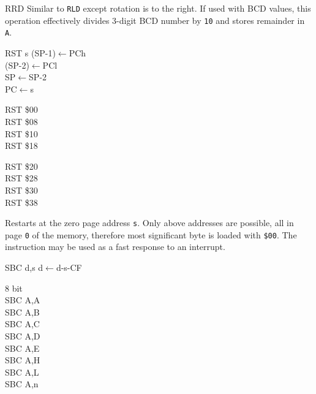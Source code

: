 \documentclass[12pt,twoside,openright,a4paper]{book}
\begin{document}
\begin{basedescript}{
	\desclabelstyle{\multilinelabel}
	\desclabelwidth{3cm}}
\begin{detailitem}{RRD}
		Similar to {\tt RLD} except rotation is to the right. If used with BCD values, this operation effectively divides 3-digit BCD number by {\tt 10} and stores remainder in {\tt A}.

		\begin{DetailEffects}[p]
		\end{DetailEffects}
						
		\begin{DetailTiming}
		\end{DetailTiming}

	\end{detailitem}

	\begin{detailitem}{RST s}
		{(SP-1)$\leftarrow$PCh\\
		(SP-2)$\leftarrow$PCl\\
		SP$\leftarrow$SP-2\\
		PC$\leftarrow$s}

		\begin{DetailVariants}
			RST \$00\\
			RST \$08\\
			RST \$10\\
			RST \$18
			
			\columnbreak
			RST \$20\\
			RST \$28\\
			RST \$30\\
			RST \$38
		\end{DetailVariants}

		Restarts at the zero page address {\tt s}. Only above addresses are possible, all in page {\tt 0} of the memory, therefore most significant byte is loaded with {\tt \$00}. The instruction may be used as a fast response to an interrupt.

		\DetailNoEffect
						
		\begin{DetailTiming}
			\DetailTime{}{3}{11}
		\end{DetailTiming}

	\end{detailitem}

	\pagebreak
	\begin{detailitem}{SBC d,s}
		{d$\leftarrow$d-s-CF}
	
		\begin{DetailVariants}
			\textnormal{8 bit}\\
			SBC A,A\\
			SBC A,B\\
			SBC A,C\\
			SBC A,D\\
			SBC A,E\\
			SBC A,H\\
			SBC A,L\\
			SBC A,n


\end{DetailVariants}
\end{detailitem}
\end{basedescript}
\end{document}

